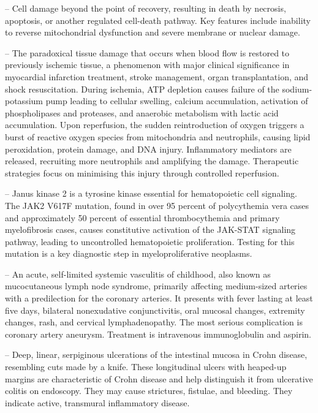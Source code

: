 -- Cell damage beyond the point of recovery, resulting in death by necrosis, apoptosis, or another regulated cell-death pathway. Key features include inability to reverse mitochondrial dysfunction and severe membrane or nuclear damage.

-- The paradoxical tissue damage that occurs when blood flow is restored to previously ischemic tissue, a phenomenon with major clinical significance in myocardial infarction treatment, stroke management, organ transplantation, and shock resuscitation. During ischemia, ATP depletion causes failure of the sodium-potassium pump leading to cellular swelling, calcium accumulation, activation of phospholipases and proteases, and anaerobic metabolism with lactic acid accumulation. Upon reperfusion, the sudden reintroduction of oxygen triggers a burst of reactive oxygen species from mitochondria and neutrophils, causing lipid peroxidation, protein damage, and DNA injury. Inflammatory mediators are released, recruiting more neutrophils and amplifying the damage. Therapeutic strategies focus on minimising this injury through controlled reperfusion.

-- Janus kinase 2 is a tyrosine kinase essential for hematopoietic cell signaling. The JAK2 V617F mutation, found in over 95 percent of polycythemia vera cases and approximately 50 percent of essential thrombocythemia and primary myelofibrosis cases, causes constitutive activation of the JAK-STAT signaling pathway, leading to uncontrolled hematopoietic proliferation. Testing for this mutation is a key diagnostic step in myeloproliferative neoplasms.

-- An acute, self-limited systemic vasculitis of childhood, also known as mucocutaneous lymph node syndrome, primarily affecting medium-sized arteries with a predilection for the coronary arteries. It presents with fever lasting at least five days, bilateral nonexudative conjunctivitis, oral mucosal changes, extremity changes, rash, and cervical lymphadenopathy. The most serious complication is coronary artery aneurysm. Treatment is intravenous immunoglobulin and aspirin.

-- Deep, linear, serpiginous ulcerations of the intestinal mucosa in Crohn disease, resembling cuts made by a knife. These longitudinal ulcers with heaped-up margins are characteristic of Crohn disease and help distinguish it from ulcerative colitis on endoscopy. They may cause strictures, fistulae, and bleeding. They indicate active, transmural inflammatory disease.

